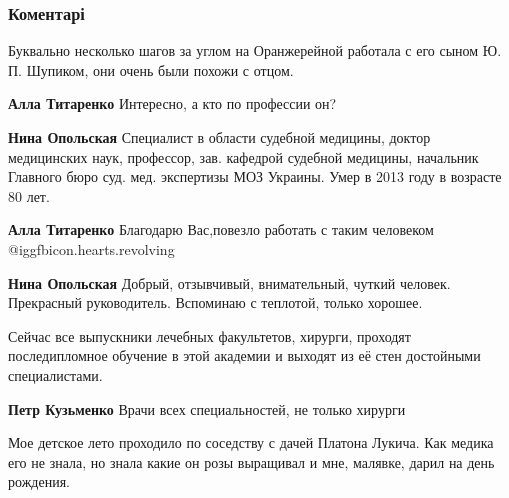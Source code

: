  
 
 
 
 
\subsubsection{Коментарі}
\label{sec:20_11_2021.fb.fb_group.story_kiev_ua.1.med_akademia_shupika.cmt}

\begin{itemize} %
Буквально несколько шагов за углом на Оранжерейной работала с его сыном Ю. П. Шупиком, они очень были похожи с отцом.

\begin{itemize} %
\textbf{Алла Титаренко} Интересно, а кто по профессии он?

\textbf{Нина Опольская} Специалист в области судебной медицины, доктор медицинских наук, профессор, зав. кафедрой судебной медицины, начальник Главного бюро суд. мед. экспертизы МОЗ Украины. Умер в 2013 году в возрасте 80 лет.

\textbf{Алла Титаренко} Благодарю Вас,повезло работать с таким человеком  @igg{fbicon.hearts.revolving} 

\textbf{Нина Опольская} Добрый, отзывчивый, внимательный, чуткий человек. Прекрасный руководитель. Вспоминаю с теплотой, только хорошее.
\end{itemize} %


Сейчас все выпускники лечебных факультетов, хирурги, проходят последипломное
обучение в этой академии и выходят из её стен достойными специалистами.

\textbf{Петр Кузьменко} Врачи всех специальностей, не только хирурги


Мое детское лето проходило по соседству с дачей Платона Лукича. Как медика его
не знала, но знала какие он розы выращивал и мне, малявке, дарил на день
рождения.

\end{itemize} %
